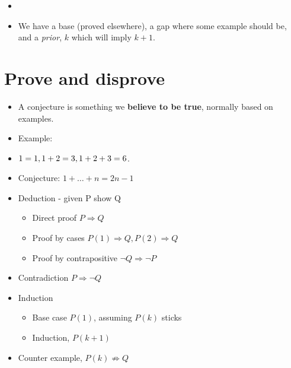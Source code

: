 \documentclass[english,10pt,a4paper]{article}
\begin{document}
\begin{theo} 
\begin{itemize}
\item 
\end{itemize}
\end{theo}



\begin{theo} 
\begin{itemize}
\item We have a base (proved elsewhere), a gap where some example should be, and a \textit{prior}, $k$ which will imply $k+1$.
\end{itemize}
\end{theo}


\newpage
\section{Prove and disprove}
\begin{theo}[Conjecture] 
\begin{itemize}
\item A conjecture is something we \textbf{believe to be true}, normally based on examples.
\item Example: 
\item[]$1=1, \\
1+2=3, \\
1+2+3=6$.
\item[] Conjecture: $1+\ldots+n=2n-1$
\end{itemize}
\end{theo}

\begin{itemize}
\item Deduction - given P show Q
\begin{itemize}
\item Direct proof $P \Rightarrow Q$
\item Proof by cases $P(1) \Rightarrow Q, P(2) \Rightarrow Q$
\item Proof by contrapositive $\neg Q \Rightarrow \neg P$
\end{itemize}
\item Contradiction $P \Rightarrow \neg Q$
\item Induction
\begin{itemize}
\item Base case $P(1)$, assuming $P(k)$ sticks
\item Induction, $P(k+1)$
\end{itemize}
\item Counter example, $P(k) \not \Rightarrow Q$
\end{itemize}
\end{document}
